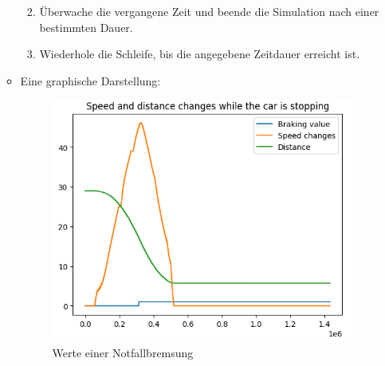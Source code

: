 \begin{enumerate}
\begin{itemize}
\begin{enumerate}
\begin{itemize}
\begin{itemize}
				\end{itemize}
			\end{itemize}
			\item Überwache die vergangene Zeit und beende die Simulation nach einer bestimmten Dauer.
			\item Wiederhole die Schleife, bis die angegebene Zeitdauer erreicht ist.
		\end{enumerate}
	  	\item Eine graphische Darstellung:
	  	\begin{figure}[H]
	  		\centering	
	  		\includegraphics[width=.7\textwidth]{img/stopping_car}
	  		\caption[Notfallbremsung]{Werte einer Notfallbremsung}
	  		\label{fig:notfallbremsung}
	  	\end{figure}
	\end{itemize}
\end{enumerate}
